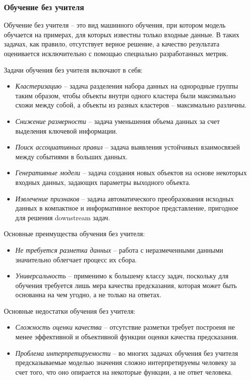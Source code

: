\documentclass[../part_1.tex]{subfiles}
\begin{document}
\subsubsection{Обучение без учителя} 
    \label{sec:without_teacher}
    \par Обучение без учителя --  это вид машинного обучения, при котором модель обучается на примерах, для которых известны только входные данные. В таких задачах, как правило, отсутствует верное решение, а качество результата оценивается исключительно с помощью специально разработанных метрик.
    \par Задачи обучения без учителя включают в себя:
    \begin{itemize}
        \item \textit{Кластеризацию} -- задача разделения набора данных на однородные группы таким образом, чтобы объекты внутри одного кластера были максимально схожи между собой, а объекты из разных кластеров -- максимально различны.
        \item \textit{Снижение размерности} -- задача уменьшения объема данных за счет выделения ключевой информации.
        \item \textit{Поиск ассоциативных правил} -- задача выявления устойчивых взаимосвязей между событиями в больших данных.
        \item \textit{Генеративные модели} -- задача создания новых объектов на основе некоторых входных данных, задающих параметры выходного объекта.
        \item \textit{Извлечение признаков} -- задача автоматического преобразования исходных данных в компактное и информативное векторое представление, пригодное для решения downstream задач.
    \end{itemize}
    \par Основные преимущества обучения без учителя:
    \begin{itemize}
        \item \textit{Не требуется разметка данных} -- работа с неразмеченными данными значительно облегчает процесс их сбора.
        \item \textit{Универсальность} -- применимо к большему классу задач, поскольку для обучения требуется лишь мера качества предсказания, которая может быть основанна на чем угодно, а не только на ответах.
    \end{itemize}
    \par Основные недостатки обучения без учителя:
    \begin{itemize}
        \item \textit{Сложность оценки качества} -- отсутствие разметки требует построеия не менее эффективной и объективной функции оценки качества предсказания.
        \item \textit{Проблема интерпретируемости} -- во многих задачах обучения без учителя предсказываемые моделью значения сложно интерпретируемы человеку за счет того, что оно опирается на некоторые функции, а не ответ человека.
    \end{itemize}
\end{document}
